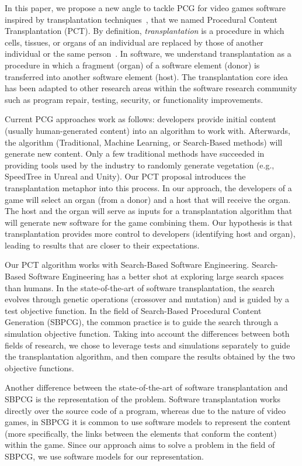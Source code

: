 In this paper, we propose a new angle to tackle PCG for video games software inspired by transplantation techniques~\cite{barr2015automated}, that we named Procedural Content Transplantation (PCT). By definition, \textit{transplantation} is a procedure in which cells, tissues, or organs of an individual are replaced by those of another individual or the same person~\cite{FARSHBAFNADI2023599}. In software, we understand transplantation as a procedure in which a fragment (organ) of a software element (donor) is transferred into another software element (host). The transplantation core idea has been adapted to other research areas within the software research community such as program repair, testing, security, or functionality improvements.

Current PCG approaches work as follows: developers provide initial content (usually human-generated content) into an algorithm to work with. Afterwards, the algorithm (Traditional, Machine Learning, or Search-Based methods) will generate new content. Only a few traditional methods have succeeded in providing tools used by the industry to randomly generate vegetation (e.g., SpeedTree in Unreal and Unity). Our PCT proposal introduces the transplantation metaphor into this process. In our approach, the developers of a game will select an organ (from a donor) and a host that will receive the organ. The host and the organ will serve as inputs for a transplantation algorithm that will generate new software for the game combining them. Our hypothesis is that transplantation provides more control to developers (identifying host and organ), leading to results that are closer to their expectations.

Our PCT algorithm works with Search-Based Software Engineering. Search-Based Software Engineering has a better shot at exploring large search spaces than humans. In the state-of-the-art of software transplantation, the search evolves through genetic operations (crossover and mutation) and is guided by a test objective function. In the field of Search-Based Procedural Content Generation (SBPCG), the common practice is to guide the search through a simulation objective function. Taking into account the differences between both fields of research, we chose to leverage tests and simulations separately to guide the transplantation algorithm, and then compare the results obtained by the two objective functions.

Another difference between the state-of-the-art of software transplantation and SBPCG is the representation of the problem. Software transplantation works directly over the source code of a program, whereas due to the nature of video games, in SBPCG it is common to use software models to represent the content (more specifically, the links between the elements that conform the content) within the game. Since our approach aims to solve a problem in the field of SBPCG, we use software models for our representation.

